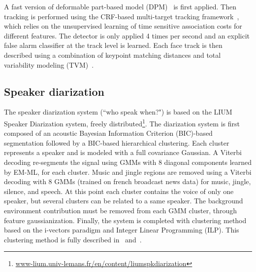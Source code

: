 A fast version of deformable part-based model (DPM)~\cite{felzenszwalb2010dpm,dubout2013deformable} is first applied. Then tracking is performed using the CRF-based multi-target tracking framework~\cite{heili2014tracking}, which relies on the unsupervised learning of time sensitive association costs for different features.
%
The detector is only applied 4 times per second and an explicit false alarm classifier at the track level is learned\cite{Le_ICPR_2016}.
%
Each face track is then described using a combination of keypoint matching distances and total variability modeling (TVM)~\cite{wallace2012total,Khoury:ICMR:2013}.

\subsection{Speaker diarization}

The speaker diarization system (``who speak when?") is based on the LIUM Speaker Diarization system\cite{rouvier2013}, freely distributed\footnote{\url{www-lium.univ-lemans.fr/en/content/liumspkdiarization}}. 
%
The diarization system is first composed of an acoustic Bayesian Information Criterion (BIC)-based segmentation followed by a BIC-based hierarchical clustering. Each cluster represents a speaker and is modeled with a full covariance Gaussian. A Viterbi decoding re-segments the signal using GMMs with 8 diagonal components learned by EM-ML, for each cluster. 
Music and jingle regions are removed using a Viterbi decoding with 8 GMMs (trained on french broadcast news data) for music, jingle, silence, and speech. %
%
At this point each cluster contains the voice of only one speaker, but several clusters can be related to a same speaker. The background environment contribution must be removed from each GMM cluster, through feature gaussianization.
%
Finally, the system is completed with clustering method based on the i-vectors paradigm and Integer Linear Programming (ILP). 
This clustering method is fully described in~\cite{rouvier12-2} and~\cite{dupuy2014}. 

